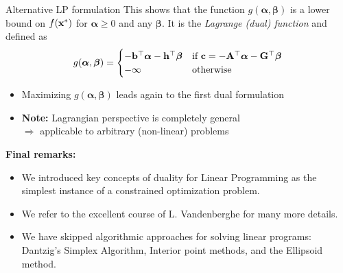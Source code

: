 \documentclass[11pt,compress,t,notes=noshow, xcolor=table]{beamer}
\begin{document}
\begin{vbframe}{Alternative LP formulation}
This shows that the function $g(\bm{\alpha},\bm{\beta})$ is a lower bound on $f(\mathbf{x}^*)$ for $\bm{\alpha} \geq 0$ and any $\bm{\beta}$.
It is the \emph{Lagrange (dual) function} and defined as
\begin{equation*}
    g(\bm{\alpha},\bm{\beta}) =
        \begin{cases}
            -\mathbf{b}^\top\bm{\alpha} -\mathbf{h}^\top\bm{\beta} & \text{if $\mathbf{c}=-\mathbf{A}^\top \bm{\alpha} - \mathbf{G}^\top \bm{\beta}$} \\
            -\infty & \text{otherwise}
        \end{cases}
\end{equation*}

\begin{itemize}
    \item Maximizing $g(\bm{\alpha},\bm{\beta})$ leads again to the first dual formulation
    \item \textbf{Note:} Lagrangian perspective is completely general \\
        $\Rightarrow$ applicable to arbitrary (non-linear) problems
\end{itemize}

\medskip

\textbf{Final remarks:}
\begin{itemize}
    \item We introduced key concepts of duality for Linear Programming as the simplest instance 
    of a constrained optimization problem.
    \item We refer to the excellent course of L. Vandenberghe  
    \href{http://www.seas.ucla.edu/~vandenbe/ee236a/ee236a.html}{} for many more details.
    \item We have skipped algorithmic approaches for solving linear programs: Dantzig's Simplex Algorithm, Interior point methods, and the Ellipsoid method.
\end{itemize}

\end{vbframe}

\endlecture
\end{document}
